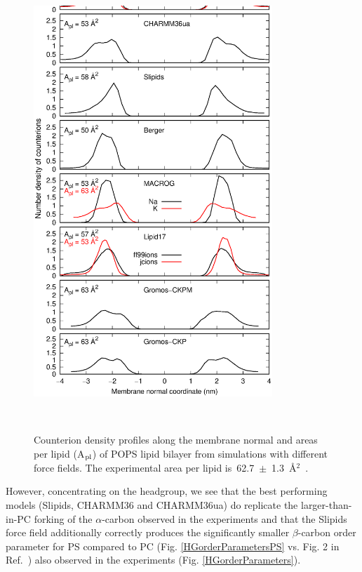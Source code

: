 \documentclass[aps,prl,superscriptaddress,twocolumn]{revtex4}
\begin{document}
\begin{figure}[!htb]
  \centering
  \includegraphics[width=9.0cm]{../Figs/NAdensPOPS.eps}
  \caption{\label{NAdensPOPS}
    Counterion density profiles along the membrane normal and areas per lipid (A$_{\rm pl}$)
    of POPS lipid bilayer from simulations with different force fields.
    The experimental area per lipid is~62.7~$\pm$~1.3~\AA$^2$~\cite{pan14}.
  }
   \\
\end{figure}



However, concentrating on the headgroup, we see that the best performing models (Slipids, CHARMM36 and CHARMM36ua) do replicate the larger-than-in-PC
forking of the $\alpha$-carbon observed in the experiments and that the Slipids force field additionally correctly produces the significantly
smaller $\beta$-carbon order parameter for PS compared to PC (Fig. \ref{HGorderParametersPS} vs. Fig. 2 in Ref.~)
also observed in the experiments (Fig. \ref{HGorderParameters}).
\end{document}
